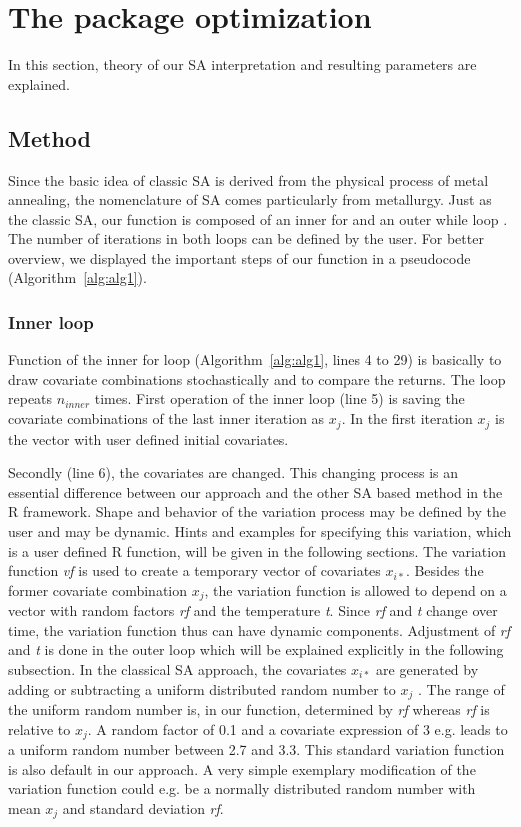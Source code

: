 \section{The package optimization}
In this section, theory of our SA interpretation and resulting parameters are explained.

\subsection{Method}
\label{subsec:method}
Since the basic idea of classic SA is derived from the physical process of metal annealing, the nomenclature of SA comes particularly from metallurgy. Just as the classic SA, our function is composed of an inner for and an outer while loop \citep{kirkpatrick_1983}. The number of iterations in both loops can be defined by the user. For better overview, we displayed the important steps of our function in a pseudocode (Algorithm~\ref{alg:alg1}).

\subsubsection{Inner loop}
Function of the inner for loop (Algorithm~\ref{alg:alg1}, lines 4 to 29) is basically to draw covariate combinations stochastically and to compare the returns. The loop repeats $n_{inner}$ times. First operation of the inner loop (line 5) is saving the covariate combinations of the last inner iteration as $x_j$. In the first iteration $x_j$ is the vector with user defined initial covariates.

Secondly (line 6), the covariates are changed. This changing process is an essential difference between our approach and the other SA based method in the R framework. Shape and behavior of the variation process may be defined by the user and may be dynamic. Hints and examples for specifying this variation, which is a user defined R function, will be given in the following sections. The variation function \textit{vf} is used to create a temporary vector of covariates $x_{i*}$. Besides the former covariate combination $x_j$, the variation function is allowed to depend on a vector with random factors \textit{rf} and the temperature \textit{t}. Since \textit{rf} and \textit{t} change over time, the variation function thus can have dynamic components. Adjustment of \textit{rf} and \textit{t} is done in the outer loop which will be explained explicitly in the following subsection. In the classical SA approach, the covariates $x_{i*}$ are generated by adding or subtracting a uniform distributed random number to $x_j$ \citep{kirkpatrick_1983}. The range of the uniform random number is, in our function, determined by \textit{rf} whereas \textit{rf} is relative to $x_j$. A random factor of 0.1 and a covariate expression of 3 e.g. leads to a uniform random number between 2.7 and 3.3. This standard variation function is also default in our approach. A very simple exemplary modification of the variation function could e.g. be a normally distributed random number with mean $x_j$ and standard deviation \textit{rf}.

